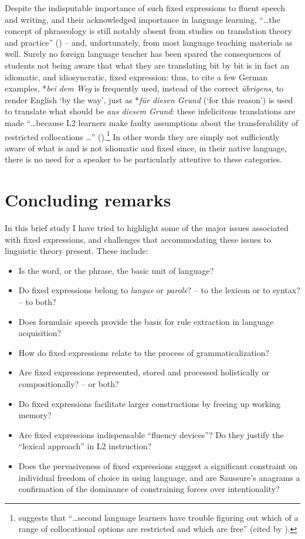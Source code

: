 \documentclass[english,output=paper,colorlinks,citecolor=brown]{../langscibook}
\begin{document}
Despite the indisputable importance of such fixed expressions to fluent speech and writing, and their acknowledged importance in language learning, “…the concept of phraseology is still notably absent from studies on translation theory and practice” (\citealt[xxiv]{GrangerMeunier2008}) – and, unfortunately, from most language teaching materials as well. Surely no foreign language teacher has been spared the consequences of students not being aware that what they are translating bit by bit is in fact an idiomatic, and idiosyncratic, fixed expression: thus, to cite a few German examples, *\textit{bei dem  Weg} is frequently used, instead of the correct \textit{übrigens}, to render English `by the way', just as *\textit{für diesen Grund} (‘for this reason') is used to translate what should be \textit{aus diesem Grund}: these infelicitous translations are made “…because L2 learners make faulty assumptions about the transferability of restricted collocations …” (\citealt[833]{KimKim2012}).\footnote{\citet[34]{Howarth1998} suggests that “…second language learners have trouble figuring out which of a range of collocational options are restricted and which are free” (cited by \citealt[833]{KimKim2012}).} In other words they are simply not sufficiently aware of what is and is not idiomatic and fixed since, in their native language, there is no need for a speaker to be particularly attentive to these categories.

\section{Concluding remarks}
In this brief study I have tried to highlight some of the major issues associated with fixed expressions, and challenges that accommodating these issues to linguistic theory present. These include:

\begin{itemize}
\item Is the word, or the phrase, the basic unit of language?
\item Do fixed expressions belong to \textit{langue} or \textit{parole}? – to the lexicon or to syntax? – to both? 
\item Does formulaic speech provide the basis for rule extraction in language acquisition?
\item How do fixed expressions relate to the process of grammaticalization?
\item Are fixed expressions represented, stored and processed holistically or compositionally? – or both?
\item Do fixed expressions facilitate larger constructions by freeing up working memory?
\item Are fixed expressions indispensable ``fluency devices''? Do they justify the ``lexical approach'' in L2 instruction?
\item Does the pervasiveness of fixed expressions suggest a significant cons\-traint on individual freedom of choice in using language, and are Saussure's anagrams a confirmation of the dominance of constraining forces over intentionality?
\end{itemize}
\end{document}
